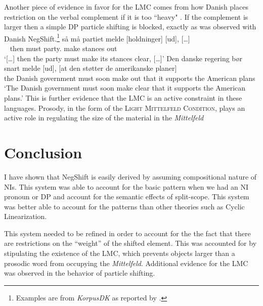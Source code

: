 \documentclass[12pt, letterpaper]{article}
\begin{document}
Another piece of evidence in favor for the LMC comes from how Danish places restriction on the verbal complement if it is too ``heavy" \citep[44f]{mullerDanishHeadDrivenPhraseInpreparation}. If the complement is larger then a simple DP particle shifting is blocked, exactly as was observed with Danish NegShift.\footnote{Examples are from \emph{KorpusDK} as reported by \citet{mullerDanishHeadDrivenPhraseInpreparation}.} 
	\ea \gll {[…]} så må partiet melde [holdninger] [ud], {[…]}\\
	~ then must party.\Def{} make stances out\\
	\glt `{[…]} then the party must make its stances clear, {[…]}'
	\ex \gll Den danske regering bør snart melde [ud], [at den støtter de amerikanske planer]\\
	the Danish government must soon make out that it supports the American plans\\
	\glt `The Danish government must soon make clear that it supports the American plans.'
	\z 
This is further evidence that the LMC is an active constraint in these languages. Prosody, in the form of the \textsc{Light Mittelfeld Condition}, plays an active role in regulating the size of the material in the \emph{Mittelfeld}

\section{Conclusion} \label{sec:CONCLUSION}

I have shown that NegShift is easily derived by assuming  compositional nature of NIs. This system was able to account for the basic pattern when we had an NI pronoun or DP and account for the semantic effects of split-scope. This system was better able to account for the patterns than other theories such as Cyclic Linearization. 

This system needed to be refined in order to account for the the fact that there are restrictions on the ``weight'' of the shifted element. This was accounted for by stipulating the existence of the LMC, which prevents objects larger than a prosodic word from occupying the \emph{Mittelfeld}. Additional evidence for the LMC was observed in the behavior of particle shifting. 


\printbibliography[heading=bibintoc]
\end{document}
